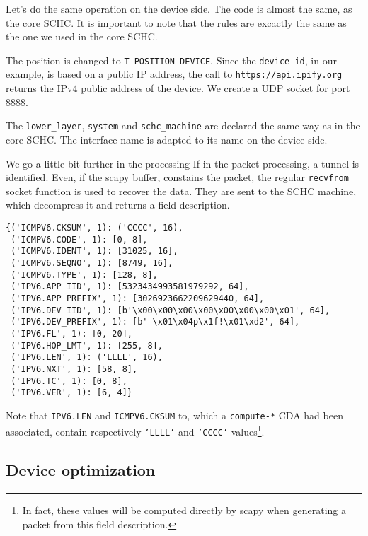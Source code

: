 Let's do the same operation on the device side. The code is almost the same, as the core SCHC. It is important to note that the rules are excactly the same as the one we used in the core SCHC.


The position is changed to \texttt{T\_POSITION\_DEVICE}.  Since the \texttt{device\_id}, in our example, is based on a public IP address, the call to \texttt{https://api.ipify.org} returns the IPv4 public address of the device. We create a UDP socket for port 8888.



The \texttt{lower\_layer}, \texttt{system} and \texttt{schc\_machine} are declared the same way as in the core SCHC.  The interface name is adapted to its name on the device side.


We go a little bit further in the processing 
If in the packet processing, a tunnel is identified. Even, if the scapy buffer, constains the packet, the regular \texttt{recvfrom} socket function is used to recover the data. They are sent to the SCHC machine, which decompress it and returns a field description.

\begin{lstlisting}
{('ICMPV6.CKSUM', 1): ('CCCC', 16),
 ('ICMPV6.CODE', 1): [0, 8],
 ('ICMPV6.IDENT', 1): [31025, 16],
 ('ICMPV6.SEQNO', 1): [8749, 16],
 ('ICMPV6.TYPE', 1): [128, 8],
 ('IPV6.APP_IID', 1): [5323434993581979292, 64],
 ('IPV6.APP_PREFIX', 1): [3026923662209629440, 64],
 ('IPV6.DEV_IID', 1): [b'\x00\x00\x00\x00\x00\x00\x00\x01', 64],
 ('IPV6.DEV_PREFIX', 1): [b' \x01\x04p\x1f!\x01\xd2', 64],
 ('IPV6.FL', 1): [0, 20],
 ('IPV6.HOP_LMT', 1): [255, 8],
 ('IPV6.LEN', 1): ('LLLL', 16),
 ('IPV6.NXT', 1): [58, 8],
 ('IPV6.TC', 1): [0, 8],
 ('IPV6.VER', 1): [6, 4]}
\end{lstlisting}

Note that \texttt{IPV6.LEN} and \texttt{ICMPV6.CKSUM} to, which a \texttt{compute-*} CDA had been associated, contain respectively \texttt{'LLLL'} and \texttt{'CCCC'} values\footnote{In fact, these values will be computed directly by scapy when generating a packet from this field description.}.

\subsection{Device optimization}


